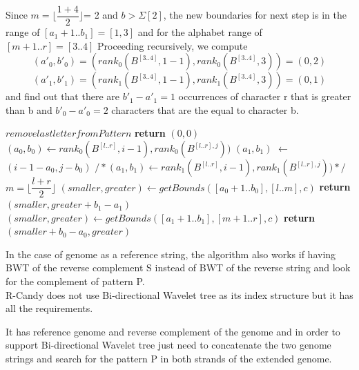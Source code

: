 \documentclass[11pt,a4paper]{report}
\begin{document}
Since  $m=\lfloor \dfrac  {1+4}{2} \rfloor$= 2 and $b > \Sigma[2]$,
the new boundaries for next step is in the range of $[a_{1}+1..b_{1}]
=[1,3]$ and for the alphabet range of $[m+1 . . r] = [3..4]$
Proceeding recursively, we compute
$$({a}'_0, b'_{0})=(rank_{0} ( B^{[3..4]} ,  1-1), rank_{0} (B^{[3..4]}, 3)) = (0 , 2) $$
$$(a'_1, b'_{1})=(rank_{1} ( B^{[3..4]} ,  1-1), rank_{1} (B^{[3..4]}, 3)) = (0 , 1) $$
and find out that there are $b'_{1}-a'_{1}=1$ occurrences 
of character r that is greater than b and $b'_{0}-a'_{0}=2 $ 
characters that are the equal to character b.
\begin{algorithm}[H]
   \caption{}
    \begin{algorithmic}[1] 
            	\State $remove last letter from Pattern$
            	\State \textbf{return} $(0,0)$
            \Else
        	     \State $(a_{0}, b_{0}) \leftarrow  rank_{0}( B^{[l..r]}, i-1), rank_{0}(B^{[l..r],j}))$
        		 \State $(a_{1}, b_{1})$ $\leftarrow$ $(i-1-a_{0}, j - b_{0}) $
        		 \State $/* (a_{1}, b_{1}) \leftarrow  rank_{1}( B^{[l..r]}, i-1), rank_{1}(B^{[l..r],j})) */$
        		 \State $m = \lfloor \dfrac  {l+r}{2} \rfloor$
        		 	\State $(smaller, greater) \leftarrow getBounds ([a_{0}+1..b_{0}],[l..m],c)$
        		 	\State \textbf{return} $(smaller, greater+b_{1}-a_{1})$
     	  		\Else 
     	  			\State $(smaller, greater) \leftarrow getBounds ([a_{1}+1..b_{1}],[m+1..r],c)$ 
     	  			\State \textbf{return} $(smaller + b_{0}-a_{0}, greater)$
     		   \EndIf
     	   \EndIf
     
    \EndFunction

	\end{algorithmic}
  \label{smaller-greater}	
\end{algorithm}

In the case of genome as a reference string, the algorithm also works if 
having BWT of the reverse complement S instead of BWT of the reverse string 
and look for the complement of pattern P.\\


R-Candy does not use Bi-directional Wavelet tree as its index structure 
but it has all the requirements.

It has reference genome and reverse complement of the genome and in order 
to support Bi-directional Wavelet tree just need to concatenate the two 
genome strings and search for the pattern P in both strands of the extended genome.
\end{document}
